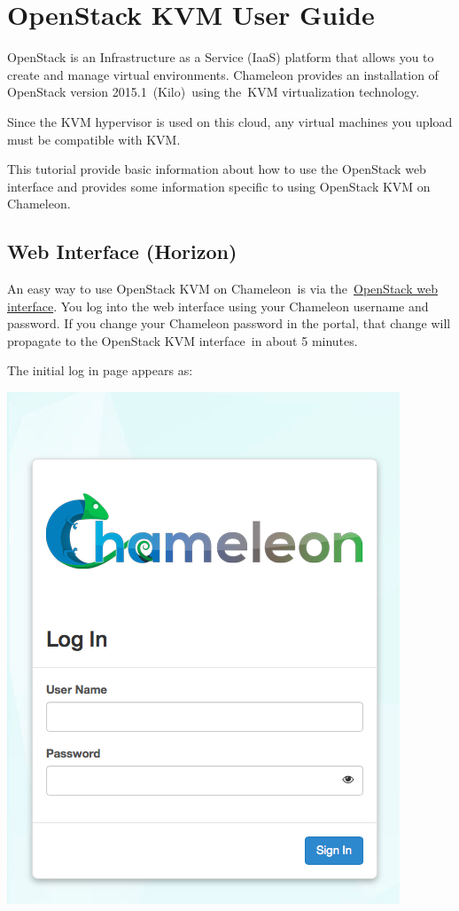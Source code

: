 
\chapter{OpenStack KVM User Guide}\label{alamo-user-guide}

OpenStack is an Infrastructure as a Service (IaaS) platform that allows
you to create and manage virtual environments. Chameleon provides an
installation of OpenStack version 2015.1~(Kilo)~using the~KVM
virtualization technology.

Since the KVM hypervisor is used on this cloud, any virtual machines you
upload must be compatible with KVM.

This tutorial provide basic information about how to use the OpenStack
web interface and provides some information specific to using OpenStack
KVM on Chameleon.

\section{Web Interface (Horizon)}\label{web-interface-horizon}

An easy way to use OpenStack KVM on Chameleon~is via
the~\href{https://openstack.tacc.chameleoncloud.org/dashboard}{OpenStack
web interface}. You log into the web interface using your Chameleon
username and password. If you change your Chameleon password in the
portal, that change will propagate to the OpenStack KVM interface~in
about 5 minutes.

The initial log in page appears as:

\includegraphics[width=\columnwidth]{images/chameleon/chameleon-login.png}

